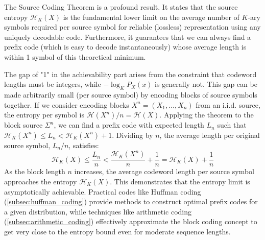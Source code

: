 \noindent The Source Coding Theorem is a profound result. It states that the source entropy $\mathcal{H}_K(X)$ is the fundamental lower limit on the average number of $K$-ary symbols required per source symbol for reliable (lossless) representation using any uniquely decodable code. Furthermore, it guarantees that we can always find a prefix code (which is easy to decode instantaneously) whose average length is within 1 symbol of this theoretical minimum.

\noindent The gap of "1" in the achievability part arises from the constraint that codeword lengths must be integers, while $-\log_K P_X(x)$ is generally not. This gap can be made arbitrarily small (per source symbol) by encoding blocks of source symbols together. If we consider encoding blocks $X^n = (X_1, \ldots, X_n)$ from an i.i.d. source, the entropy per symbol is $\mathcal{H}(X^n)/n = \mathcal{H}(X)$. Applying the theorem to the block source $\Sigma^n$, we can find a prefix code with expected length $L_n$ such that $\mathcal{H}_K(X^n) \le L_n < \mathcal{H}_K(X^n) + 1$. Dividing by $n$, the average length per original source symbol, $L_n/n$, satisfies:
\begin{equation}
    \mathcal{H}_K(X) \le \frac{L_n}{n} < \frac{\mathcal{H}_K(X^n)}{n} + \frac{1}{n} = \mathcal{H}_K(X) + \frac{1}{n}
\end{equation}
As the block length $n$ increases, the average codeword length per source symbol approaches the entropy $\mathcal{H}_K(X)$. This demonstrates that the entropy limit is asymptotically achievable. Practical codes like Huffman coding (\autoref{subsec:huffman_coding}) provide methods to construct optimal prefix codes for a given distribution, while techniques like arithmetic coding (\autoref{subsec:arithmetic_coding}) effectively approximate the block coding concept to get very close to the entropy bound even for moderate sequence lengths.

\clearpage
